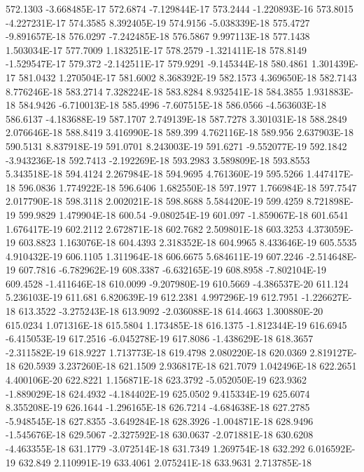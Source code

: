 572.1303  -3.668485E-17
572.6874  -7.129844E-17
573.2444  -1.220893E-16
573.8015  -4.227231E-17
574.3585  8.392405E-19
574.9156  -5.038339E-18
575.4727  -9.891657E-18
576.0297  -7.242485E-18
576.5867  9.997113E-18
577.1438  1.503034E-17
577.7009  1.183251E-17
578.2579  -1.321411E-18
578.8149  -1.529547E-17
579.372  -2.142511E-17
579.9291  -9.145344E-18
580.4861  1.301439E-17
581.0432  1.270504E-17
581.6002  8.368392E-19
582.1573  4.369650E-18
582.7143  8.776246E-18
583.2714  7.328224E-18
583.8284  8.932541E-18
584.3855  1.931883E-18
584.9426  -6.710013E-18
585.4996  -7.607515E-18
586.0566  -4.563603E-18
586.6137  -4.183688E-19
587.1707  2.749139E-18
587.7278  3.301031E-18
588.2849  2.076646E-18
588.8419  3.416990E-18
589.399  4.762116E-18
589.956  2.637903E-18
590.5131  8.837918E-19
591.0701  8.243003E-19
591.6271  -9.552077E-19
592.1842  -3.943236E-18
592.7413  -2.192269E-18
593.2983  3.589809E-18
593.8553  5.343518E-18
594.4124  2.267984E-18
594.9695  4.761360E-19
595.5266  1.447417E-18
596.0836  1.774922E-18
596.6406  1.682550E-18
597.1977  1.766984E-18
597.7547  2.017790E-18
598.3118  2.002021E-18
598.8688  5.584420E-19
599.4259  8.721898E-19
599.9829  1.479904E-18
600.54  -9.080254E-19
601.097  -1.859067E-18
601.6541  1.676417E-19
602.2112  2.672871E-18
602.7682  2.509801E-18
603.3253  4.373059E-19
603.8823  1.163076E-18
604.4393  2.318352E-18
604.9965  8.433646E-19
605.5535  4.910432E-19
606.1105  1.311964E-18
606.6675  5.684611E-19
607.2246  -2.514648E-19
607.7816  -6.782962E-19
608.3387  -6.632165E-19
608.8958  -7.802104E-19
609.4528  -1.411646E-18
610.0099  -9.207980E-19
610.5669  -4.386537E-20
611.124  5.236103E-19
611.681  6.820639E-19
612.2381  4.997296E-19
612.7951  -1.226627E-18
613.3522  -3.275243E-18
613.9092  -2.036088E-18
614.4663  1.300880E-20
615.0234  1.071316E-18
615.5804  1.173485E-18
616.1375  -1.812344E-19
616.6945  -6.415053E-19
617.2516  -6.045278E-19
617.8086  -1.438629E-18
618.3657  -2.311582E-19
618.9227  1.713773E-18
619.4798  2.080220E-18
620.0369  2.819127E-18
620.5939  3.237260E-18
621.1509  2.936817E-18
621.7079  1.042496E-18
622.2651  4.400106E-20
622.8221  1.156871E-18
623.3792  -5.052050E-19
623.9362  -1.889029E-18
624.4932  -4.184402E-19
625.0502  9.415334E-19
625.6074  8.355208E-19
626.1644  -1.296165E-18
626.7214  -4.684638E-18
627.2785  -5.948545E-18
627.8355  -3.649284E-18
628.3926  -1.004871E-18
628.9496  -1.545676E-18
629.5067  -2.327592E-18
630.0637  -2.071881E-18
630.6208  -4.463355E-18
631.1779  -3.072514E-18
631.7349  1.269754E-18
632.292  6.016592E-19
632.849  2.110991E-19
633.4061  2.075241E-18
633.9631  2.713785E-18
